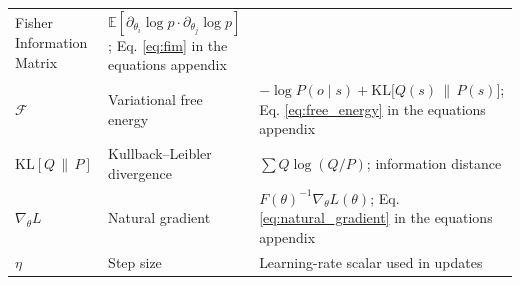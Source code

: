 \documentclass[
  10pt,
]{article}
\begin{document}
\begin{longtable}[]{@{}lll@{}}
\begin{minipage}[t]{0.30\columnwidth}
Fisher Information Matrix\strut
\end{minipage} & \begin{minipage}[t]{0.30\columnwidth}\raggedright
\(\mathbb{E}[\partial_{\theta_i}\log p \cdot \partial_{\theta_j}\log p]\);
Eq. \eqref{eq:fim} in the equations appendix\strut
\end{minipage}\tabularnewline
\begin{minipage}[t]{0.30\columnwidth}\raggedright
\(\mathcal{F}\)\strut
\end{minipage} & \begin{minipage}[t]{0.30\columnwidth}\raggedright
Variational free energy\strut
\end{minipage} & \begin{minipage}[t]{0.30\columnwidth}\raggedright
\(-\log P(o\mid s) + \mathrm{KL}\big[Q(s)\,\|\,P(s)\big]\); Eq.
\eqref{eq:free_energy} in the equations appendix\strut
\end{minipage}\tabularnewline
\begin{minipage}[t]{0.30\columnwidth}\raggedright
\(\mathrm{KL}[Q\,\|\,P]\)\strut
\end{minipage} & \begin{minipage}[t]{0.30\columnwidth}\raggedright
Kullback--Leibler divergence\strut
\end{minipage} & \begin{minipage}[t]{0.30\columnwidth}\raggedright
\(\sum Q\log(Q/P)\); information distance\strut
\end{minipage}\tabularnewline
\begin{minipage}[t]{0.30\columnwidth}\raggedright
\(\nabla_{\theta} L\)\strut
\end{minipage} & \begin{minipage}[t]{0.30\columnwidth}\raggedright
Natural gradient\strut
\end{minipage} & \begin{minipage}[t]{0.30\columnwidth}\raggedright
\(F(\theta)^{-1} \nabla_{\theta} L(\theta)\); Eq.
\eqref{eq:natural_gradient} in the equations appendix\strut
\end{minipage}\tabularnewline
\begin{minipage}[t]{0.30\columnwidth}\raggedright
\(\eta\)\strut
\end{minipage} & \begin{minipage}[t]{0.30\columnwidth}\raggedright
Step size\strut
\end{minipage} & \begin{minipage}[t]{0.30\columnwidth}\raggedright
Learning-rate scalar used in updates\strut

\end{minipage}
\end{longtable}
\end{document}

